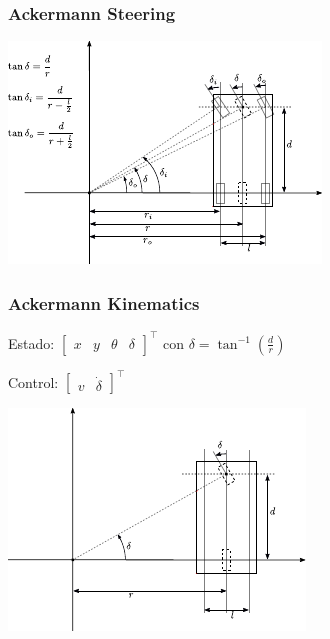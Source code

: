 \begin{frame}
    \frametitle{Ackermann Steering}
    
    \begin{center}
        \includegraphics[width=0.6\columnwidth]{images/ackermann_steering.pdf}
    \end{center}
    
\end{frame}

\begin{frame}
    \frametitle{Ackermann Kinematics}
    
    Estado: $\begin{bmatrix} x & y & \theta & \delta \end{bmatrix}^{\top}$ con $\delta = \tan^{-1}{\left(\frac{d}{r}\right)}$
    
    Control: $\begin{bmatrix} v & \dot{\delta} \end{bmatrix}^{\top}$
    
    
    \begin{center}
        \includegraphics[width=0.6\columnwidth]{images/ackermann_kinematics.pdf}
    \end{center}
    
\end{frame}


